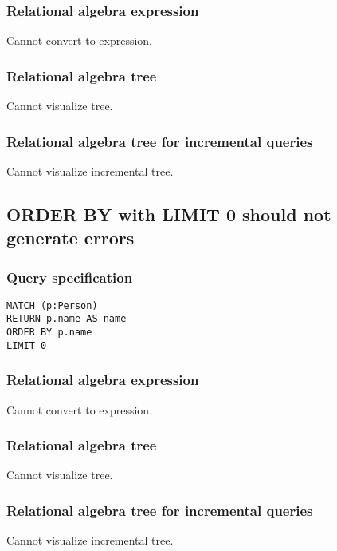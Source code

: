 \subsubsection*{Relational algebra expression}

Cannot convert to expression.

\subsubsection*{Relational algebra tree}

Cannot visualize tree.

\subsubsection*{Relational algebra tree for incremental queries}

Cannot visualize incremental tree.

\subsection{ORDER BY with LIMIT 0 should not generate errors}

\subsubsection*{Query specification}

\begin{lstlisting}
MATCH (p:Person)
RETURN p.name AS name
ORDER BY p.name
LIMIT 0
\end{lstlisting}

\subsubsection*{Relational algebra expression}

Cannot convert to expression.

\subsubsection*{Relational algebra tree}

Cannot visualize tree.

\subsubsection*{Relational algebra tree for incremental queries}

Cannot visualize incremental tree.

